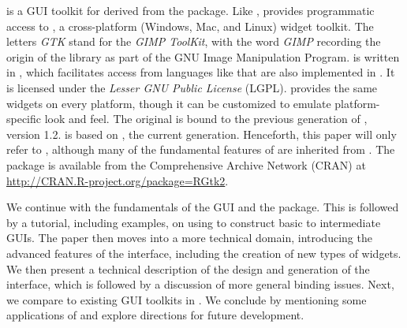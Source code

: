 \documentclass[article,shortnames]{jss}
\begin{document}
 is a GUI toolkit for  derived from the
 package.
Like ,  provides programmatic access to
, 
a cross-platform (Windows, Mac, and Linux) widget toolkit. 
The letters \emph{GTK} stand for the \emph{GIMP ToolKit}, with the
word \emph{GIMP} recording the origin of the library as part of the
GNU Image Manipulation Program.  is written in ,
which
facilitates access from languages like  that are also
implemented 
in . It is licensed under the \emph{Lesser GNU Public
License} (LGPL).
 provides the same widgets on every platform, though it can be customized to emulate platform-specific look and feel. The original  is bound to the previous generation of , version 1.2.  is based on , the current generation. Henceforth, this paper will only refer to , although many of the fundamental features of  are inherited from . The package is available from the Comprehensive  Archive Network (CRAN) at \url{http://CRAN.R-project.org/package=RGtk2}.

We continue with the fundamentals of the  GUI and the
 package. This is followed by a tutorial, including
examples, on using  to construct basic to intermediate
GUIs. The paper then moves into a more technical domain, introducing
the advanced features of the interface, including the creation of new
types of widgets. We then present a technical description of the
design and generation of the interface, which is followed by a
discussion of more general binding issues.  Next, we compare
 to existing GUI toolkits in .  We conclude by
mentioning some applications of  and explore directions for
future development.
\end{document}
